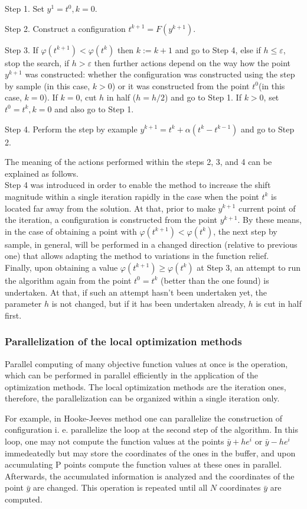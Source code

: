 \documentclass[runningheads]{llncs}
\begin{document}
Step 1. Set $y^1  = t^0, k = 0$.

Step 2. Construct a configuration $t^{k+1} = F(y^{k +1})$.

Step 3. If $\varphi(t^{k+1}) < \varphi(t^{k})$ then $k:=k+1$ and go to Step 4, else if $h \leq \varepsilon$, stop the search, if $h > \varepsilon$ then further actions depend on the  way how the point $y^{k+1}$ was constructed: whether the configuration was constructed using the step by sample (in this case, $k > 0$) or it was constructed from the point $t^0$(in this case, $k=0$). If $k=0$, cut $h$ in half ($h=h/2$) and go to Step 1. If $k>0$, set $t^0 = t^k, k=0$ and also go to Step 1.

Step 4. Perform the step by example $y^{k+1} = t^k + \alpha (t^k - t^{k-1})$ and go to Step 2.

The meaning of the actions performed within the steps 2, 3, and 4 can be explained as follows. \\
Step 4 was introduced in order to enable the method to increase the shift magnitude within a single iteration rapidly in the case when the point $t^k$ is located far away from the solution. At that, prior to make $y^{k+1}$ current point of the iteration, a configuration is constructed from the point $y^{k+1}$. By these means, in the case of obtaining a point with $\varphi(t^{k+1})< \varphi(t^k)$, the next step by sample, in general, will be performed in a changed direction (relative to previous one) that allows adapting the method to variations in the function relief.\\
Finally, upon obtaining a value $\varphi(t^{k+1}) \geq \varphi(t^k)$ at Step 3, an attempt to run the algorithm again from the point $t^0=t^k$ (better than the one found) is undertaken. At that, if such an attempt hasn’t been undertaken yet, the parameter $h$ is not changed, but if it has been undertaken already, $h$ is cut in half first.

\subsubsection{Parallelization of the local optimization methods}

Parallel computing of many objective function values at once is the operation, which can be performed in parallel efficiently in the application of the optimization methods. The local optimization methods are the iteration ones, therefore, the parallelization can be organized within a single iteration only.

For example, in Hooke-Jeeves method one can parallelize the construction of configuration i. e. parallelize the loop at the second step of the algorithm. In this loop, one may not compute the function values at the points $\bar{y} + he^i$ or $\bar{y} - he^i$ immedeatedly but may store the coordinates of the ones in the buffer, and upon accumulating P points compute the function values at these ones in parallel. Afterwards, the accumulated information is analyzed and the coordinates of the point $\bar{y}$ are changed. This operation is repeated until all $N$ coordinates $\bar{y}$ are computed.
\end{document}
